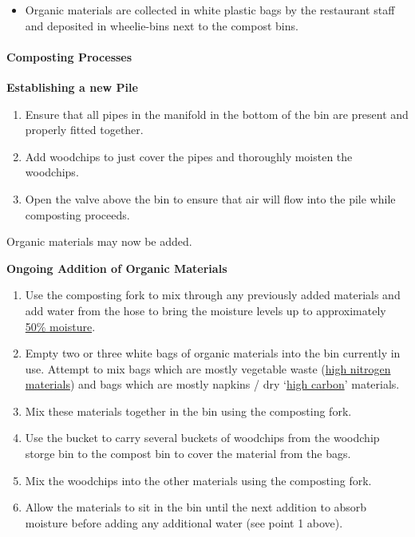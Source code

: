 \begin{itemize}
\itemsep1pt\parskip0pt
\item
  Organic materials are collected in white plastic bags by the
  restaurant staff and deposited in wheelie-bins next to the compost
  bins.
\end{itemize}

\paragraph{Composting Processes}\label{composting-processes}

\textbf{Establishing a new Pile}

\begin{enumerate}
\def\labelenumi{\arabic{enumi}.}
\itemsep1pt\parskip0pt
\item
  Ensure that all pipes in the manifold in the bottom of the bin are
  present and properly fitted together.
\item
  Add woodchips to just cover the pipes and thoroughly moisten the
  woodchips.
\item
  Open the valve above the bin to ensure that air will flow into the
  pile while composting proceeds.
\end{enumerate}

Organic materials may now be added.

\textbf{Ongoing Addition of Organic Materials}

\begin{enumerate}
\def\labelenumi{\arabic{enumi}.}
\itemsep1pt\parskip0pt
\item
  Use the composting fork to mix through any previously added materials
  and add water from the hose to bring the moisture levels up to
  approximately \hyperref[50moisture]{50\% moisture}.
\item
  Empty two or three white bags of organic materials into the bin
  currently in use. Attempt to mix bags which are mostly vegetable waste
  (\hyperref[highnitrogen]{high nitrogen materials}) and bags which are
  mostly napkins / dry `\hyperref[highcarbon]{high carbon}' materials.
\item
  Mix these materials together in the bin using the composting fork.
\item
  Use the bucket to carry several buckets of woodchips from the woodchip
  storge bin to the compost bin to cover the material from the bags.
\item
  Mix the woodchips into the other materials using the composting fork.
\item
  Allow the materials to sit in the bin until the next addition to
  absorb moisture before adding any additional water (see point 1
  above).
\end{enumerate}

